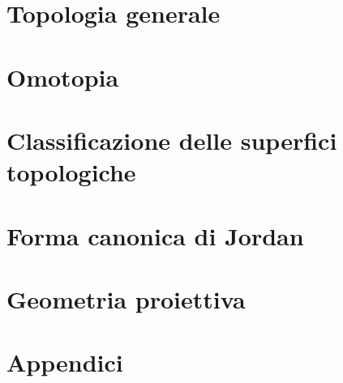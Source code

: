 \documentclass[a4paper, 11pt, twoside, openright, italian]{memoir}
\begin{document}
\frontmatter

%


\mainmatter

\part{Topologia generale}






\part{Omotopia}


\part{Classificazione delle superfici topologiche}

%
\part{Forma canonica di Jordan}

\part{Geometria proiettiva}

%
%
%
%
%
%
\part{Appendici}

%
%
%
%
\backmatter

\end{document}
